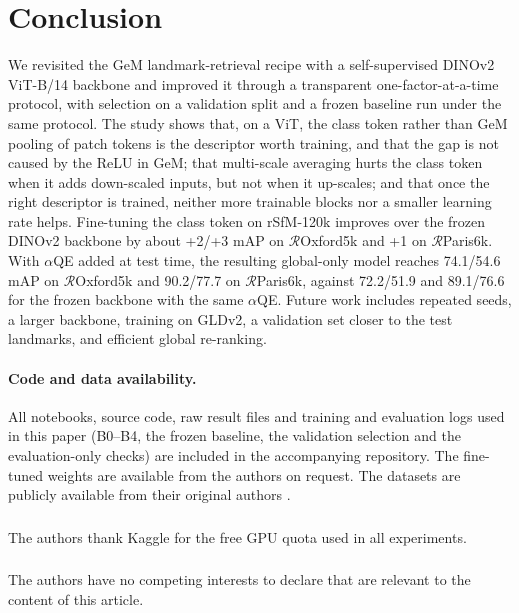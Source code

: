 \documentclass[runningheads]{llncs}
\newcommand{\roxf}{$\mathcal{R}$Oxford5k}
\newcommand{\rpar}{$\mathcal{R}$Paris6k}
\newcommand{\aqe}{$\alpha$QE}
\begin{document}
\section{Conclusion}
\label{sec:conclusion}

We revisited the GeM landmark-retrieval recipe with a self-supervised DINOv2
ViT-B/14 backbone and improved it through a transparent one-factor-at-a-time
protocol, with selection on a validation split and a frozen baseline run
under the same protocol. The study shows that, on a ViT, the class token rather
than GeM pooling of patch tokens is the descriptor worth training, and that the
gap is not caused by the ReLU in GeM; that multi-scale averaging hurts the
class token when it adds down-scaled inputs, but not when it up-scales; and
that once the right descriptor is trained, neither more trainable blocks nor a
smaller learning rate helps. Fine-tuning the class token on rSfM-120k improves
over the frozen DINOv2 backbone by about +2/+3 mAP on \roxf{} and +1 on
\rpar{}. With \aqe{} added at test time, the resulting global-only model
reaches 74.1/54.6 mAP on \roxf{} and 90.2/77.7 on \rpar{}, against 72.2/51.9
and 89.1/76.6 for the frozen backbone with the same \aqe{}. Future work
includes repeated seeds, a larger backbone, training on GLDv2, a validation
set closer to the test landmarks, and efficient global re-ranking.

\paragraph{Code and data availability.}
All notebooks, source code, raw result files and training and evaluation
logs used in this paper (B0--B4, the frozen baseline, the validation selection
and the evaluation-only checks) are included in the accompanying repository.
The fine-tuned weights are available from the authors on request.
The datasets are publicly available from their original authors
\cite{radenovic2019gem,radenovic2018revisiting}.

\begin{credits}
\subsubsection{\ackname}
The authors thank Kaggle for the free GPU quota used in all experiments.

\subsubsection{\discintname}
The authors have no competing interests to declare that are relevant to the
content of this article.
\end{credits}



\end{document}
